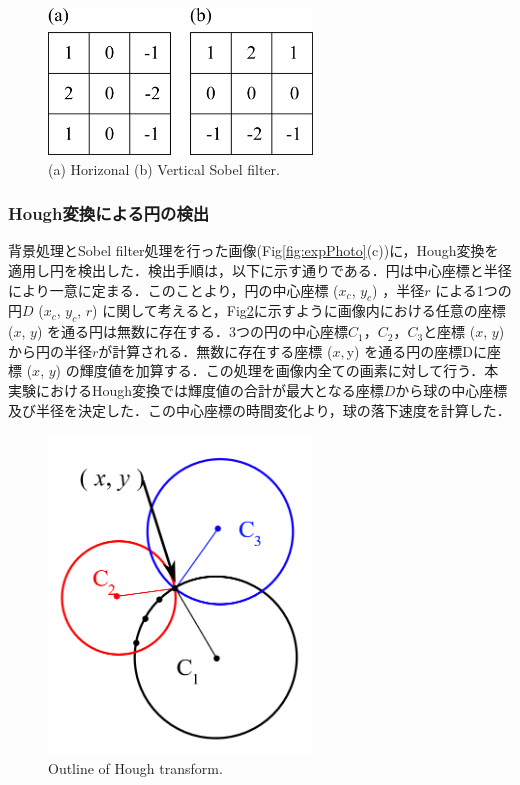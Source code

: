 \begin{figure}[h]
    \centering
    \includegraphics[width=7.0cm,clip]{2-Methods/sobel-filter.png}
    \caption{(a) Horizonal (b) Vertical Sobel filter.}
    \label{fig:sobel}
\end{figure}

\clearpage

\subsubsection{Hough変換による円の検出}
背景処理とSobel filter処理を行った画像(Fig\ref{fig:expPhoto}(c))に，Hough変換を適用し円を検出した．検出手順は，以下に示す通りである．円は中心座標と半径により一意に定まる．このことより，円の中心座標 ($x_c$, $y_c$) ，半径$r$ による1つの円$D$ ($x_c$, $y_c$, $r$) に関して考えると，Fig\ref{fig:hough}に示すように画像内における任意の座標 ($x$, $y$) を通る円は無数に存在する．3つの円の中心座標$C_1$，$C_2$，$C_3$と座標 ($x$, $y$) から円の半径$r$が計算される．無数に存在する座標 ($x, $y) を通る円の座標Dに座標 ($x$, $y$) の輝度値を加算する．この処理を画像内全ての画素に対して行う．本実験におけるHough変換では輝度値の合計が最大となる座標$D$から球の中心座標及び半径を決定した．この中心座標の時間変化より，球の落下速度を計算した．

\begin{figure}[h]
    \centering
    \includegraphics[width=7.0cm,clip]{2-Methods/hough.PNG}
    \caption{Outline of Hough transform.}
    \label{fig:hough}
\end{figure}

